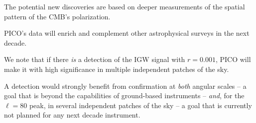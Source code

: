 \documentclass[PICOReport.tex]{subfiles}
\begin{document}
The potential new discoveries are based on deeper measurements of the spatial pattern of the CMB's polarization.


PICO's data will enrich and complement other astrophysical surveys in the next decade.

We note that if there {\it is} a detection of the \ac{IGW} signal with $r=0.001$, PICO will make it with high significance in multiple independent patches of the sky. 


A detection would strongly benefit from confirmation at {\it both} angular 
scales -- a goal that is beyond the capabilities of ground-based instruments -- {\it and}, for the $\ell = 80$ peak, 
in several independent patches of the sky -- a goal that is currently not planned for any next decade instrument. 
\end{document}
